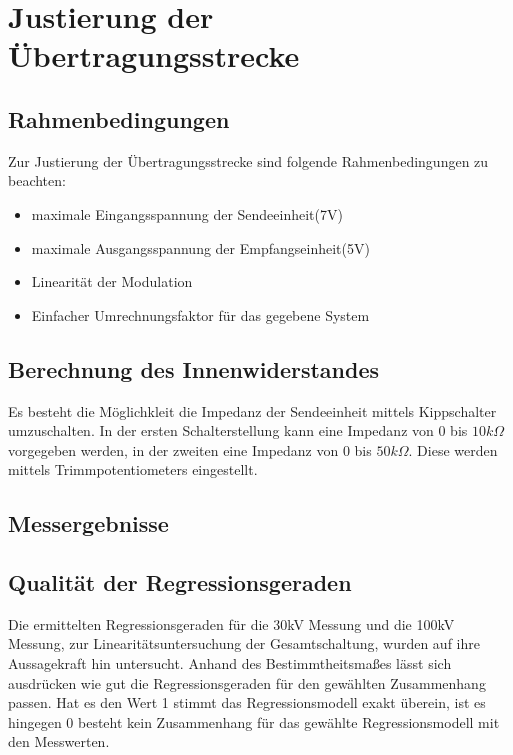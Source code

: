 \section{Justierung der Übertragungsstrecke}
\subsection{Rahmenbedingungen}
Zur Justierung der Übertragungsstrecke sind folgende Rahmenbedingungen zu beachten:
\begin{itemize}
\item maximale Eingangsspannung der Sendeeinheit(7V)
\item maximale Ausgangsspannung der Empfangseinheit(5V)
\item Linearität der Modulation
\item Einfacher Umrechnungsfaktor für das gegebene System
\end{itemize}

\subsection{Berechnung des Innenwiderstandes}
Es besteht die Möglichkleit die Impedanz der Sendeeinheit mittels Kippschalter umzuschalten. In der ersten Schalterstellung kann eine Impedanz von 0 bis $10k\Omega$ vorgegeben werden, in der zweiten eine Impedanz von 0 bis $50k\Omega$. Diese werden mittels Trimmpotentiometers eingestellt. 
\subsection{Messergebnisse}
  	\begin{figure}[H]
		
		
		\end{figure}
		\begin{figure}[H]
	
	\end{figure}
	\begin{figure}[H]
		
		\end{figure}
		\begin{figure}[H]
	
	\end{figure}

\subsection{Qualität der Regressionsgeraden}
\begin{figure}[H]
\centering
\end{figure}
Die ermittelten Regressionsgeraden für die 30kV Messung und die 100kV Messung, zur Linearitätsuntersuchung der Gesamtschaltung, wurden auf ihre Aussagekraft hin untersucht. Anhand des Bestimmtheitsmaßes lässt sich ausdrücken wie gut die Regressionsgeraden für den gewählten Zusammenhang passen. Hat es den Wert 1 stimmt das Regressionsmodell exakt überein, ist es hingegen 0 besteht kein Zusammenhang für das gewählte Regressionsmodell mit den Messwerten.

